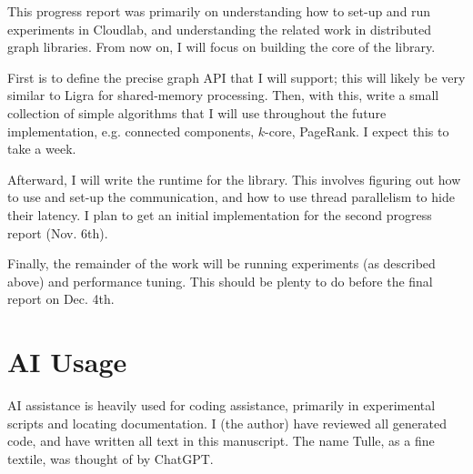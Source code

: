 \documentclass{article}
\begin{document}

This progress report was primarily on understanding how to set-up and run experiments in Cloudlab, and understanding the related work in distributed graph libraries.
From now on, I will focus on building the core of the library.

First is to define the precise graph API that I will support; this will likely be very similar to Ligra for shared-memory processing.
Then, with this, write a small collection of simple algorithms that I will use throughout the future implementation, e.g. connected components, $k$-core, PageRank.
I expect this to take a week.

Afterward, I will write the runtime for the library.
This involves figuring out how to use and set-up the communication, and how to use thread parallelism to hide their latency.
I plan to get an initial implementation for the second progress report (Nov. 6th).

Finally, the remainder of the work will be running experiments (as described above) and performance tuning.
This should be plenty to do before the final report on Dec. 4th.

\section{AI Usage}

AI assistance is heavily used for coding assistance, primarily in experimental scripts and locating documentation.
I (the author) have reviewed all generated code, and have written all text in this manuscript.
The name Tulle, as a fine textile, was thought of by ChatGPT.

\printbibliography
\end{document}
